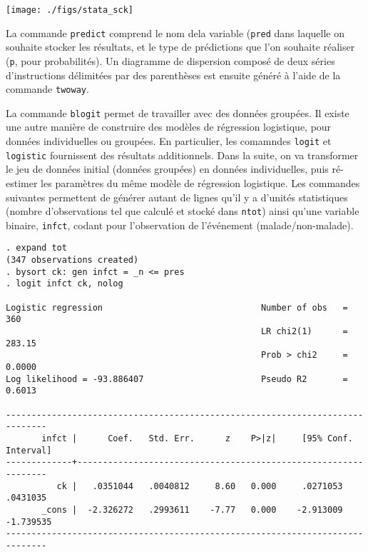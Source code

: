 \texttt{[image: ./figs/stata\_sck]}

La commande \texttt{predict} comprend le nom dela variable (\texttt{pred}
dans laquelle on souhaite stocker les résultats, et le type de prédictions
que l'on souhaite réaliser (\texttt{p}, pour probabilités). Un diagramme de
dispersion composé de deux séries d'instructions délimitées par des
parenthèses est ensuite généré à l'aide de la commande \texttt{twoway}.

La commande \texttt{blogit} permet de travailler avec des données
groupées. Il existe une autre manière de construire des modèles de
régression logistique, pour données individuelles ou groupées. En
particulier, les comamndes \texttt{logit} et \texttt{logistic} fournissent
des résultats additionnels. Dans la suite, on va transformer le jeu de
données initial (données groupées) en données individuelles, puis ré-estimer
les paramètres du même modèle de régression logistique. Les commandes
suivantes permettent de générer autant de lignes qu'il y a d'unités
statistiques (nombre d'observations tel que calculé et stocké dans
\texttt{ntot}) ainsi qu'une variable binaire, \texttt{infct}, codant pour
l'observation de l'événement (malade/non-malade).
\begin{verbatim}
. expand tot
(347 observations created)
. bysort ck: gen infct = _n <= pres
. logit infct ck, nolog

Logistic regression                               Number of obs   =        360
                                                  LR chi2(1)      =     283.15
                                                  Prob > chi2     =     0.0000
Log likelihood = -93.886407                       Pseudo R2       =     0.6013

------------------------------------------------------------------------------
       infct |      Coef.   Std. Err.      z    P>|z|     [95% Conf. Interval]
-------------+----------------------------------------------------------------
          ck |   .0351044   .0040812     8.60   0.000     .0271053    .0431035
       _cons |  -2.326272   .2993611    -7.77   0.000    -2.913009   -1.739535
------------------------------------------------------------------------------
\end{verbatim}

